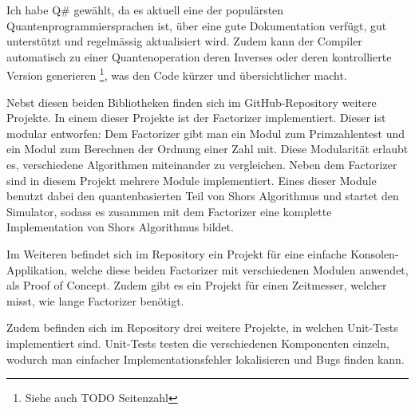 Ich habe Q\# gewählt, da es aktuell eine der populärsten Quantenprogrammiersprachen ist, über eine gute Dokumentation verfügt, gut unterstützt und regelmässig aktualisiert wird. Zudem kann der Compiler automatisch zu einer Quantenoperation deren Inverses oder deren kontrollierte Version generieren \footnote{Siehe auch TODO Seitenzahl}, was den Code kürzer und übersichtlicher macht.

Nebst diesen beiden Bibliotheken finden sich im GitHub-Repository weitere Projekte. In einem dieser Projekte ist der \grqq Factorizer\grqq{} implementiert. Dieser ist modular entworfen: Dem Factorizer gibt man ein Modul zum Primzahlentest und ein Modul zum Berechnen der Ordnung einer Zahl mit. %
Diese Modularität erlaubt es, verschiedene Algorithmen miteinander zu vergleichen. Neben dem \grqq Factorizer\grqq{} sind in diesem Projekt mehrere Module implementiert. Eines dieser Module benutzt dabei den quantenbasierten Teil von Shors Algorithmus und startet den Simulator, sodass es zusammen mit dem \grqq Factorizer\grqq{} eine komplette Implementation von Shors Algorithmus bildet.

Im Weiteren befindet sich im Repository ein Projekt für eine einfache Konsolen-Applikation, welche diese beiden \grqq Factorizer\grqq{} mit verschiedenen Modulen anwendet, als Proof of Concept. Zudem gibt es ein Projekt für einen Zeitmesser, welcher misst, wie lange \grqq Factorizer \grqq{} benötigt.

Zudem befinden sich im Repository drei weitere Projekte, in welchen Unit-Tests implementiert sind. Unit-Tests testen die verschiedenen Komponenten einzeln, wodurch man einfacher Implementationsfehler lokalisieren und Bugs finden kann.